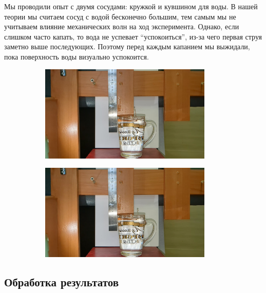 \documentclass[a4paper, 12pt]{article}
\begin{document}
Мы проводили опыт с двумя сосудами: кружкой и кувшином для воды.
В нашей теории мы считаем сосуд с водой бесконечно большим, тем самым
мы не учитываем влияние механических волн на ход эксперимента.
Однако, если слишком часто капать, то вода не успевает  ``успокоиться'',
из-за чего первая струя заметно выше последующих. Поэтому перед каждым
капанием мы выжидали, пока поверхность воды визуально успокоится.

\begin{figure}[H]
    \begin{subfigure}{0.5\textwidth}
        \includegraphics[width=0.9\textwidth]{img/Experiment data/Cup/40_5 fast/Fast cup 40_5.2.jpg}
    \end{subfigure}%
    \begin{subfigure}{0.5\textwidth}
        \includegraphics[width=0.9\textwidth]{img/Experiment data/Cup/40_5 fast/Fast cup 40_5.4.jpg}
    \end{subfigure}
\end{figure}

\subsection*{Обработка результатов}
\end{document}
